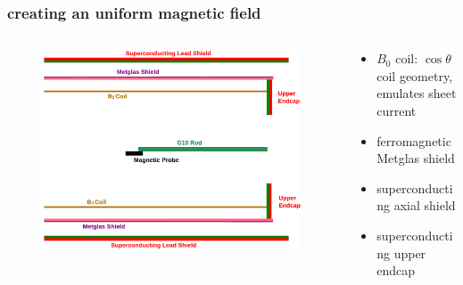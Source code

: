 \documentclass[handout]{beamer}
\begin{document}
\begin{frame}
\frametitle{creating an uniform magnetic field}

    \begin{columns}
    
    \begin{column}{0.5\textwidth}
    \begin{figure}
    \includegraphics[width=\textwidth, angle=90, trim=70px 70px 70px 70px]
    {figures/simplified_structure.eps}
    \end{figure}
    \end{column}

    \pause

    \begin{column}{0.5\textwidth}
    \begin{itemize}
        \item $B_0$ coil: $\cos\theta$ coil geometry, emulates sheet current \pause
        \item ferromagnetic Metglas shield \pause
        \item superconducting axial shield \pause
        \item superconducting upper endcap
    \end{itemize}
    \end{column}

    \end{columns}

\end{frame}

%
%
\end{document}
